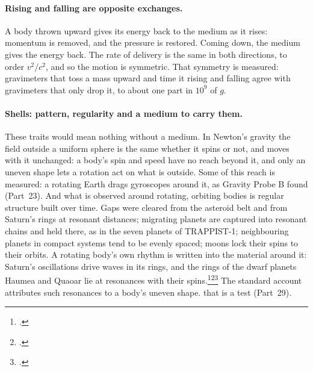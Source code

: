 \documentclass[11pt,a4paper]{article}
\newcommand{\fn}[1]{\footnote{\citealp{#1}.}}
\begin{document}
\paragraph{Rising and falling are opposite exchanges.} A body thrown upward gives its energy back to the medium as it rises: momentum is removed, and the pressure is restored. Coming down, the medium gives the energy back. The rate of delivery is the same in both directions, to order $v^2/c^2$, and so the motion is symmetric. That symmetry is measured: gravimeters that toss a mass upward and time it rising and falling agree with gravimeters that only drop it, to about one part in $10^9$ of $g$. 

\paragraph{Shells: pattern, regularity and a medium to carry them.} 

These traits would mean nothing without a medium. In Newton's gravity the field outside a uniform sphere is the same whether it spins or not, and moves with it unchanged: a body's spin and speed have no reach beyond it, and only an uneven shape lets a rotation act on what is outside.  Some of this reach is measured: a rotating Earth drags gyroscopes around it, as Gravity Probe B found (Part~23). And what is observed around rotating, orbiting bodies is regular structure built over time. Gaps were cleared from the asteroid belt and from Saturn's rings at resonant distances; migrating planets are captured into resonant chains and held there, as in the seven planets of TRAPPIST-1; neighbouring planets in compact systems tend to be evenly spaced; moons lock their spins to their orbits. A rotating body's own rhythm is written into the material around it: Saturn's oscillations drive waves in its rings, and the rings of the dwarf planets Haumea and Quaoar lie at resonances with their spins.\fn{hedman2013}\fn{ortiz2017}\fn{morgado2023} The standard account attributes such resonances to a body's uneven shape.  that is a test (Part~29).
\end{document}
